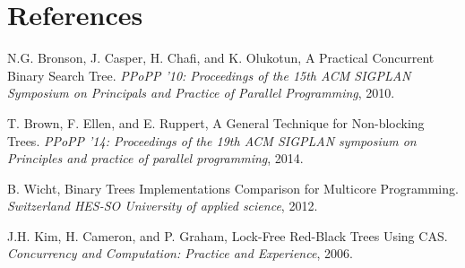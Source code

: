 \documentclass[finalreport,12pt]{elsarticle}
\begin{document}








\section*{References}
 \begin{thebibliography}{5}



  N.G. Bronson, J. Casper, H. Chafi,  and K. Olukotun, A Practical Concurrent Binary Search Tree. \emph {PPoPP '10: Proceedings of the 15th ACM SIGPLAN Symposium on Principals and Practice of Parallel Programming}, 2010.
  
	  T. Brown, F. Ellen, and E. Ruppert,  A General Technique for Non-blocking Trees. \emph {PPoPP '14: Proceedings of the 19th ACM SIGPLAN symposium on Principles and practice of parallel programming}, 2014.
	  		  
		B. Wicht,  Binary Trees Implementations Comparison for Multicore Programming. \emph{Switzerland HES-SO University of applied science}, 2012.
		
		J.H. Kim, H. Cameron, and P. Graham,  Lock-Free Red-Black Trees Using CAS. \emph{ Concurrency
		and Computation: Practice and Experience}, 2006.

 \end{thebibliography}
\end{document}
